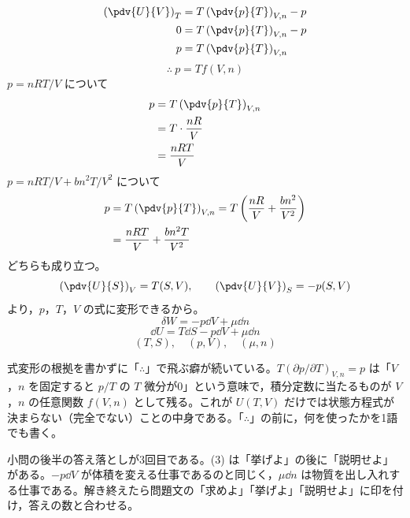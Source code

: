 \begin{align*}
\left(\pdv{U}{V}\right)_{T}&=T\left(\pdv{p}{T}\right)_{V,n}-p\\
0&=T\left(\pdv{p}{T}\right)_{V,n}-p\\
p&=T\left(\pdv{p}{T}\right)_{V,n}
\end{align*}
\[ \therefore\ p=Tf(V,n) \]
$p=nRT/V$ について
\begin{align*}
p&=T\left(\pdv{p}{T}\right)_{V,n}\\
&=T\cdot\frac{nR}{V}\\
&=\frac{nRT}{V}
\end{align*}
$p=nRT/V+bn^{2}T/V^{2}$ について
\begin{align*}
p&=T\left(\pdv{p}{T}\right)_{V,n}=T\left(\frac{nR}{V}+\frac{bn^{2}}{V^{2}}\right)\\
&=\frac{nRT}{V}+\frac{bn^{2}T}{V^{2}}
\end{align*}
どちらも成り立つ。
\[ \left(\pdv{U}{S}\right)_{V}=T(S,V), \qquad \left(\pdv{U}{V}\right)_{S}=-p(S,V) \]
より，$p$，$T$，$V$ の式に変形できるから。
\[ \delta W=-p\dd V+\mu\dd n \]
\[ \dd U=T\dd S-p\dd V+\mu\dd n \]
\[ (T,S),\quad (p,V),\quad (\mu,n) \]
\item {} 式変形の根拠を書かずに「$\therefore$」で飛ぶ癖が続いている。$T(\partial p/\partial T)_{V,n}=p$ は「$V$，$n$ を固定すると $p/T$ の $T$ 微分が0」という意味で，積分定数に当たるものが $V$，$n$ の任意関数 $f(V,n)$ として残る。これが $U(T,V)$ だけでは状態方程式が決まらない（完全でない）ことの中身である。「$\therefore$」の前に，何を使ったかを1語でも書く。
\item {} 小問の後半の答え落としが3回目である。(3) は「挙げよ」の後に「説明せよ」がある。$-p\dd V$ が体積を変える仕事であるのと同じく，$\mu\dd n$ は物質を出し入れする仕事である。解き終えたら問題文の「求めよ」「挙げよ」「説明せよ」に印を付け，答えの数と合わせる。
